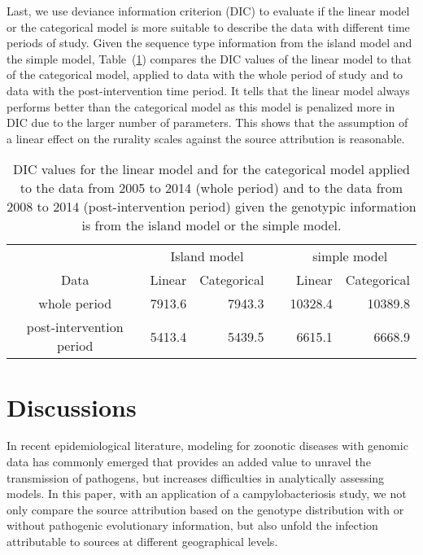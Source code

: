 \documentclass[times, doublespace]{WileyNJD-v2}%
\begin{document}
Last, we use deviance information criterion (DIC) to evaluate if the linear model or the categorical model is more suitable to describe the data with different time periods of study. Given the sequence type information from the island model and the simple model, Table~(\ref{tab3}) compares the DIC values of the linear model to that of the categorical model, applied to data with the whole period of study and to data with the post-intervention time period. It tells that the linear model always performs better than the categorical model as this model is penalized more in DIC due to the larger number of parameters. This shows that the assumption of a linear effect on the rurality scales against the source attribution is reasonable. 

\begin{table}
  \begin{center}
    \begin{tabular}{crrrrr}
      \toprule
      & \multicolumn{2}{c}{Island model}  & \multicolumn{1}{c}{} & \multicolumn{2}{c}{simple model} \\
      Data & Linear & Categorical & & Linear & Categorical\\ \midrule
      whole period  & 7913.6 & 7943.3  & & 10328.4  & 10389.8 \\
      post-intervention period  & 5413.4  & 5439.5  & & 6615.1   & 6668.9 \\
      \bottomrule
    \end{tabular}
  \end{center}
  \caption{DIC values for the linear model and for the categorical model applied to the data from 2005 to 2014 (whole period) and to the data from 2008 to 2014 (post-intervention period) given the genotypic information is from the island model or the simple model.}
  \label{tab3}
\end{table}

\section{Discussions}
In recent epidemiological literature, modeling for zoonotic diseases with genomic data has commonly emerged that provides an added value to unravel the transmission of pathogens, but increases difficulties in analytically assessing models. In this paper, with an application of a campylobacteriosis study, we not only compare the source attribution based on the genotype distribution with or without pathogenic evolutionary information, but also unfold the infection attributable to sources at different geographical levels. 
\end{document}
